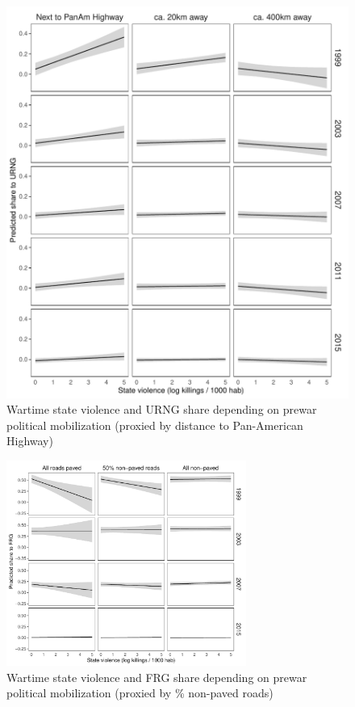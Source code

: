 \documentclass[a4paper, 12pt, notitlepage]{article}
\begin{document}
\begin{figure}[htb!]
  \centering
    \includegraphics[width = \textwidth]{img/pp_URNG_panam_year}

  \caption{Wartime state violence and URNG share depending on prewar political mobilization (proxied by distance to Pan-American Highway)} \label{fig:pp_URNG_panam_yrs}

\end{figure}

\begin{figure}[htb!]
  \centering
    \includegraphics[width = 0.7\textwidth]{img/pp_FRG_roads_year}

  \caption{Wartime state violence and FRG share depending on prewar political mobilization (proxied by \% non-paved roads)} \label{fig:pp_FRG_roads_yrs}

\end{figure}
\end{document}

